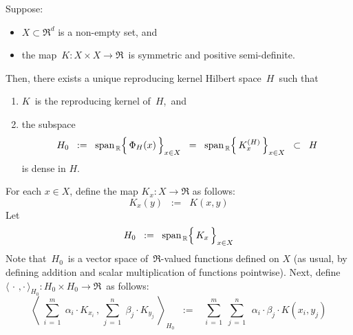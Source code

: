 \vskip 0.5cm
\begin{theorem}
\mbox{}
\vskip 0.1cm
\noindent
Suppose:
\begin{itemize}
\item
	$X \subset \Re^{d}$ is a non-empty set, and
\item
	the map \,$K : X \times X \longrightarrow \Re$\, is symmetric and positive semi-definite.
\end{itemize}
Then, there exists a unique reproducing kernel Hilbert space \,$H$\, such that
\begin{enumerate}
\item
	$K$\, is the reproducing kernel of \,$H$,\, and
\item
	the subspace
	\begin{equation*}
	H_{0}
	\;\; := \;\;
		\span_{\,\Re}\!\left\{\,\overset{{\color{white}.}}{\Phi_{H}(x)}\,\right\}_{x \in X}
	\;\; = \;\;
		\span_{\,\Re}\!\left\{\,K^{(H)}_{x}\,\right\}_{x \in X}
	\;\; \subset \;\;
		H
	\end{equation*}
	is dense in $H$.
\end{enumerate}
\end{theorem}
\proof
For each $x \in X$, define the map $K_{x} : X \longrightarrow \Re$ as follows:
\begin{equation*}
K_{x}(y) \;\; := \;\; K(x,y)
\end{equation*}
Let
\begin{equation*}
H_{0}
\;\; := \;\;
	\span_{\,\Re}\!\left\{\,\overset{{\color{white}.}}{K_{x}}\,\right\}_{x \in X}
\end{equation*}
Note that \,$H_{0}$\, is a vector space of \,$\Re$-valued functions
defined on $X$
(as usual, by defining addition and scalar multiplication of functions pointwise).
Next, define
\,$\langle\,\cdot\,,\cdot\,\rangle_{H_{0}} : H_{0} \times H_{0} \longrightarrow \Re$\,
as follows:
\begin{equation*}
\left\langle\;
	\overset{m}{\underset{i\,=\,1}{\sum}}\; \alpha_{i} \cdot K_{x_{i}}
	\,,\,
	\overset{n}{\underset{j\,=\,1}{\sum}}\; \beta_{j} \cdot K_{y_{j}}
	\;\right\rangle_{\!\!H_{0}}
\;\; := \;\;\;
	\overset{m}{\underset{i\,=\,1}{\sum}}\;
	\overset{n}{\underset{j\,=\,1}{\sum}}\;\,
	\alpha_{i} \cdot \beta_{j} \cdot K(x_{i},y_{j})
\end{equation*}


